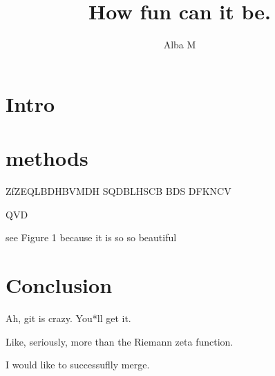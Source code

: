 \documentclass{article}
\author{Alba M}
\title{How fun can it be.}
\begin{document}
	\maketitle
	\section{Intro}
	\section{methods}
	ZfZEQLBDHBVMDH
	SQDBLHSCB
	BDS
	DFKNCV
	
	QVD
	
	see Figure 1 because it is so so beautiful
	
	\section{Conclusion}
	Ah, git is crazy. You*ll get it.
	
	Like, seriously, more than the Riemann zeta function.
	
	I would like to successuflly merge.
	
\end{document}

